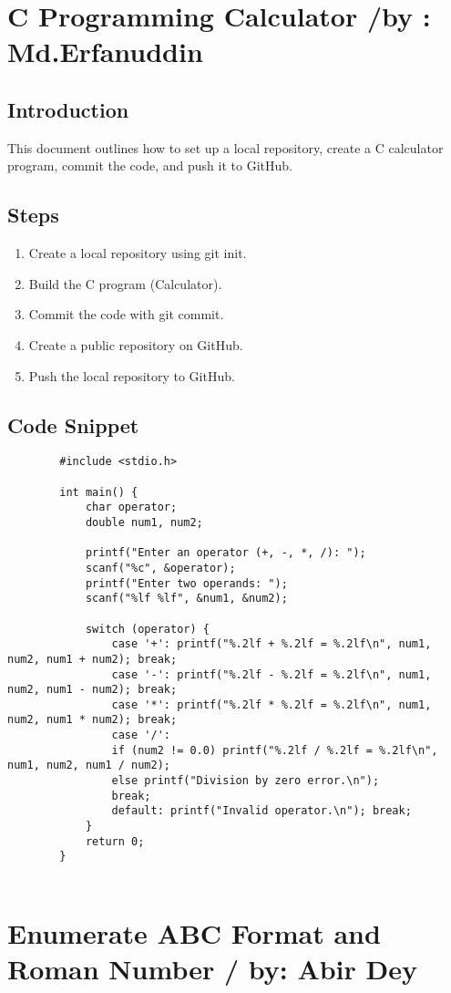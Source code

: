 \documentclass[12pt,a4paper]{article}
\begin{document}
	\newpage
	\tableofcontents
	
	\newpage
	\section{C Programming Calculator /by : Md.Erfanuddin}
	\subsection{Introduction}
	This document outlines how to set up a local repository, create a C calculator program, commit the code, and push it to GitHub.
	\subsection{Steps}
	\begin{enumerate}
		\item Create a local repository using git init.
		\item Build the C program (Calculator).
		\item Commit the code with git commit.
		\item Create a public repository on GitHub.
		\item Push the local repository to GitHub.
	\end{enumerate}
	\subsection{Code Snippet}
	\begin{verbatim}
		#include <stdio.h>
		
		int main() {
			char operator;
			double num1, num2;
			
			printf("Enter an operator (+, -, *, /): ");
			scanf("%c", &operator);
			printf("Enter two operands: ");
			scanf("%lf %lf", &num1, &num2);
			
			switch (operator) {
				case '+': printf("%.2lf + %.2lf = %.2lf\n", num1, num2, num1 + num2); break;
				case '-': printf("%.2lf - %.2lf = %.2lf\n", num1, num2, num1 - num2); break;
				case '*': printf("%.2lf * %.2lf = %.2lf\n", num1, num2, num1 * num2); break;
				case '/': 
				if (num2 != 0.0) printf("%.2lf / %.2lf = %.2lf\n", num1, num2, num1 / num2);
				else printf("Division by zero error.\n");
				break;
				default: printf("Invalid operator.\n"); break;
			}
			return 0;
		}
		
	\end{verbatim}
	\newpage
	\section{Enumerate ABC Format and Roman Number / by: Abir Dey}
\end{document}
